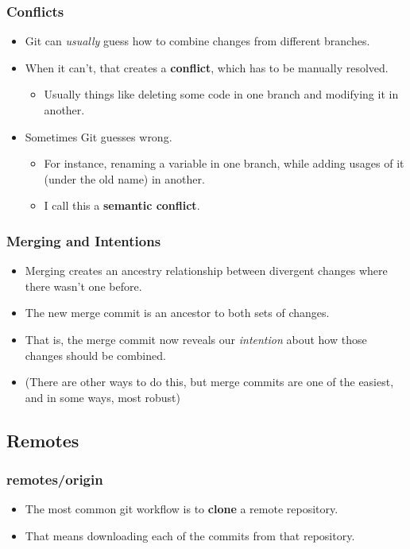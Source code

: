 \documentclass{beamer}
\begin{document}
\begin{frame}
  \frametitle{Conflicts}
  \begin{itemize}
    \pause
  \item Git can \textit{usually} guess how to combine changes from different branches.
    \pause
  \item When it can't, that creates a \textbf{conflict}, which has to be manually resolved.
    \begin{itemize}
      \pause
    \item Usually things like deleting some code in one branch and modifying it in another.
    \end{itemize}
    \pause
  \item Sometimes Git guesses wrong.
    \begin{itemize}
      \pause
    \item For instance, renaming a variable in one branch, while adding usages of it (under the old name) in another.
      \pause
    \item I call this a \textbf{semantic conflict}.
    \end{itemize}
  \end{itemize}
\end{frame}

\begin{frame}
  \frametitle{Merging and Intentions}

  \begin{itemize}
    \pause
  \item Merging creates an ancestry relationship between divergent changes where there wasn't one before.
    \pause
  \item The new merge commit is an ancestor to both sets of changes.
    \pause
  \item That is, the merge commit now reveals our \textit{intention} about how those changes should be combined.
    \pause
  \item (There are other ways to do this, but merge commits are one of the easiest, and in some ways, most robust)
  \end{itemize}
\end{frame}

\subsection{Remotes}

\begin{frame}
  \frametitle{remotes/origin}
  \begin{itemize}
    \pause
  \item The most common git workflow is to \textbf{clone} a remote repository.
    \pause
  \item That means downloading each of the commits from that repository.
  \end{itemize}
\end{frame}
\end{document}
